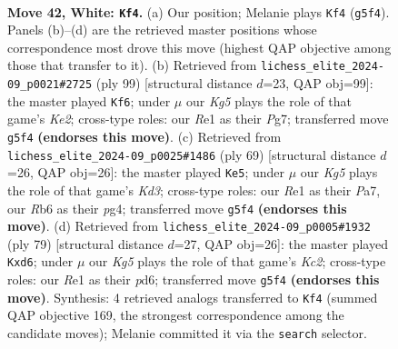 \documentclass[11pt]{article}
\begin{document}
\clearpage

\begin{figure}[p]\centering
\begin{subfigure}{0.46\textwidth}\centering
\resizebox{\linewidth}{!}{%
\newchessgame
\chessboard[
  setfen={1r6/1p3pk1/pR2p3/6K1/P3P3/5P1P/7P/4R3 w - - 13 42},
  showmover=false,
  pgfstyle=straightmove, color=movearrow, markmove={g5-f4}
]}
\caption{}
\end{subfigure}\hfill
\begin{subfigure}{0.46\textwidth}\centering
\resizebox{\linewidth}{!}{%
\newchessgame
\chessboard[
  setfen={8/1p2k1p1/2p5/p1Pr4/P2P2P1/6K1/3R4/8 b - - 0 50},
  showmover=false,
  pgfstyle=straightmove, color=movearrow, markmove={e7-f6}
]}
\caption{}
\end{subfigure}
\\[4pt]
\begin{subfigure}{0.46\textwidth}\centering
\resizebox{\linewidth}{!}{%
\newchessgame
\chessboard[
  setfen={2r5/pp4p1/3kp3/5ppP/P1P3P1/3K1P2/8/2R5 b - - 0 35},
  showmover=false,
  pgfstyle=straightmove, color=movearrow, markmove={d6-e5}
]}
\caption{}
\end{subfigure}\hfill
\begin{subfigure}{0.46\textwidth}\centering
\resizebox{\linewidth}{!}{%
\newchessgame
\chessboard[
  setfen={8/2k2p2/3Pp1p1/r1p5/P2p1P2/3P1K2/2P5/R7 b - - 0 40},
  showmover=false,
  pgfstyle=straightmove, color=movearrow, markmove={c7-d6}
]}
\caption{}
\end{subfigure}
\caption{\textbf{Move 42, White: \texttt{Kf4}.} (a) Our position; Melanie plays \texttt{Kf4} (\texttt{g5f4}). Panels (b)--(d) are the retrieved master positions whose correspondence most drove this move (highest QAP objective among those that transfer to it). (b) Retrieved from \texttt{lichess\_elite\_2024-09\_p0021\#2725} (ply 99) [structural distance $d$=23, QAP obj=99]: the master played \texttt{Kf6}; under $\mu$ our \emph{Kg5} plays the role of that game's \emph{Ke2}; cross-type roles: our \emph{R}e1 as their \emph{P}g7; transferred move \texttt{g5f4} \textbf{(endorses this move)}. (c) Retrieved from \texttt{lichess\_elite\_2024-09\_p0025\#1486} (ply 69) [structural distance $d$=26, QAP obj=26]: the master played \texttt{Ke5}; under $\mu$ our \emph{Kg5} plays the role of that game's \emph{Kd3}; cross-type roles: our \emph{R}e1 as their \emph{P}a7, our \emph{R}b6 as their \emph{p}g4; transferred move \texttt{g5f4} \textbf{(endorses this move)}. (d) Retrieved from \texttt{lichess\_elite\_2024-09\_p0005\#1932} (ply 79) [structural distance $d$=27, QAP obj=26]: the master played \texttt{Kxd6}; under $\mu$ our \emph{Kg5} plays the role of that game's \emph{Kc2}; cross-type roles: our \emph{R}e1 as their \emph{p}d6; transferred move \texttt{g5f4} \textbf{(endorses this move)}. Synthesis: 4 retrieved analogs transferred to \texttt{Kf4} (summed QAP objective 169, the strongest correspondence among the candidate moves); Melanie committed it via the \texttt{search} selector.}
\label{fig:thought-m82}
\end{figure}
\end{document}
